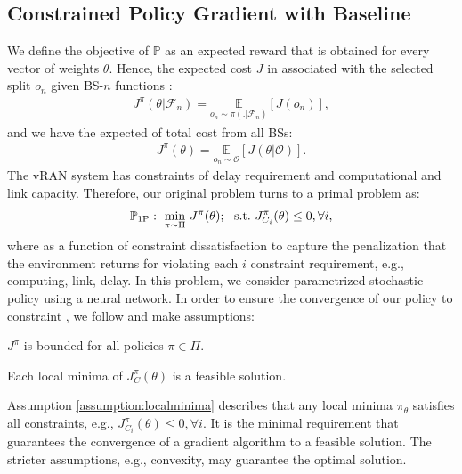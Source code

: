 \subsection{Constrained Policy Gradient with Baseline}
%
%
%
%
%
%
We define the objective of $\mathbb{P}$ as an expected reward that is obtained for every vector of weights $\theta$. Hence, the expected cost $J$ in associated with the selected split $o_n$ given BS-$n$ functions :
%
\begin{align}
	J^\pi(\theta|\mathcal{F}_n) = \underset{o_n \sim \pi(.|\mathcal{F}_n) }{\mathbb{E}} [ J(o_n) ],
\end{align}
%
and we have the expected of total cost from all BSs:
%
\begin{align} \label{eq:total_cost_theta}
J^\pi(\theta) = \underset{o_n \sim \mathcal{O} }{\mathbb{E}} [ J(\theta|\mathcal{O}) ].
\end{align}
%
The vRAN system has constraints of delay requirement and computational and link capacity. 
%
%
Therefore, our original problem turns to a primal problem as:
%
\begin{align} 
\mathbb{P}_{1\text{P}}: \ \underset{\pi \sim \Pi }{\text{min}} \  J^\pi(\theta); \ \ \text{s.t.} \ {\color{black}J_{C_i}^\pi(\theta) \leq 0, \forall i}, \notag
\end{align}
%
where  as a function of constraint dissatisfaction to capture the penalization that the environment returns for violating each $i$ constraint requirement, e.g., computing, link, delay. 
In this problem, we consider parametrized stochastic policy using a neural network. In order to ensure the convergence of our policy to constraint , we follow \cite{reward_constraint} and make assumptions:
%
\begin{assumption} \label{assumption:cost}
	$J^\pi$ is bounded for all policies $\pi \in \Pi$.
\end{assumption}
\begin{assumption} \label{assumption:localminima}
	Each local minima of $J_{C}^\pi(\theta)$  is a feasible solution.
\end{assumption}
\noindent
Assumption \ref{assumption:localminima} describes that any local minima $\pi_\theta$ satisfies all constraints, e.g., $J_{C_i}^\pi(\theta) \leq 0, \forall i$. It is the minimal requirement that guarantees the convergence of a gradient algorithm to a feasible solution. The stricter assumptions, e.g., convexity, may guarantee the optimal solution.
%

